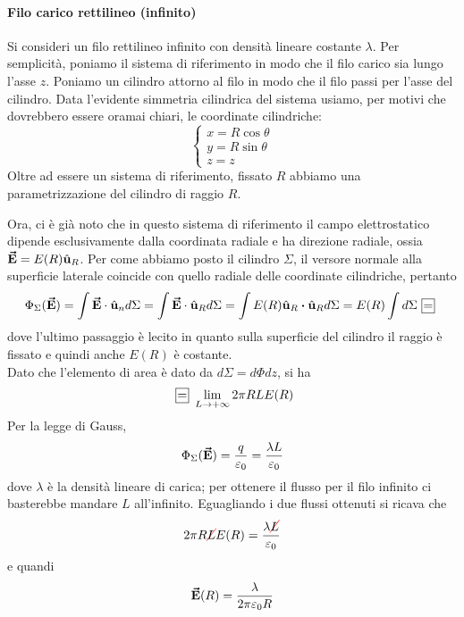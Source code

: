 \paragraph{Filo carico rettilineo (infinito)}
	Si consideri un filo rettilineo infinito con densità lineare costante $\lambda$. Per semplicità, poniamo il sistema di riferimento in modo che il filo carico sia lungo l'asse $z$. Poniamo un cilindro attorno al filo in modo che il filo passi per l'asse del cilindro. Data l'evidente simmetria cilindrica del sistema usiamo, per motivi che dovrebbero essere oramai chiari, le coordinate cilindriche:
\begin{equation*}
	\begin{cases}
		x=R\cos\theta\\
		y=R\sin\theta\\
		z=z
	\end{cases}
\end{equation*}
Oltre ad essere un sistema di riferimento, fissato $R$ abbiamo una parametrizzazione del cilindro di raggio $R$.

Ora, ci è già noto che in questo sistema di riferimento il campo elettrostatico dipende esclusivamente dalla coordinata radiale e ha direzione radiale, ossia $\vb*{\va{E}}=E(R)\hat{\mathbf{u}}_R$. Per come abbiamo posto il cilindro $\Sigma$, il versore normale alla superficie laterale coincide con quello radiale delle coordinate cilindriche, pertanto
\begin{equation*}
	\Phi_{\Sigma}(\vba{E})=\int\vba{E}\cdot\vbh{u}_nd\Sigma=\int\vba{E}\cdot\vbh{u}_Rd\Sigma=\int E(R)\vbh{u}_R\vdot\vbh{u}_Rd\Sigma=E(R)\int d\Sigma\squarequal
\end{equation*}
dove l'ultimo passaggio è lecito in quanto sulla superficie del cilindro il raggio è fissato e quindi anche $E(R)$ è costante.\\
Dato che l'elemento di area è dato da $d\Sigma=d\Phi dz$, si ha
\begin{equation*}
	\squarequal\lim_{L\to+\infty}2\pi R L E(R)
\end{equation*}
Per la legge di Gauss,
\begin{equation*}
	\Phi_{\Sigma}(\vb*{\va{E}})=\frac{q}{\varepsilon_0}=\frac{\lambda L}{\varepsilon_0}
\end{equation*}
dove $\lambda$ è la densità lineare di carica; per ottenere il flusso per il filo infinito ci basterebbe mandare $L$ all'infinito. Eguagliando i due flussi ottenuti si ricava che
\begin{equation*}
	2\pi R\Ccancel[red]{L}E(R)=\frac{\lambda \Ccancel[red]{L}}{\epsilon_0}
\end{equation*}
e quandi
\begin{equation}
	\vb*{\va{E}}(R)=\frac{\lambda}{2\pi\varepsilon_0 R}
\end{equation}
